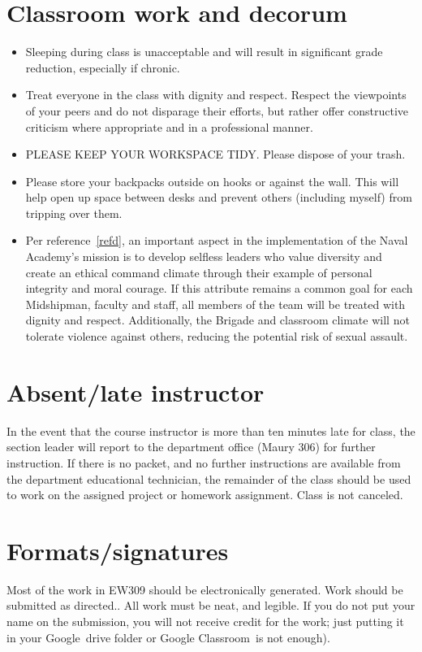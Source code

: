 \documentclass[11pt,courier]{navymemo}
\newcommand{\Google}{Google}
\newcommand{\GoogleClassroom}{Google Classroom}
\begin{document}
\section{Classroom work and decorum}
\begin{itemize}
\item Sleeping during class is unacceptable and will result in significant grade reduction, especially if chronic.
\item Treat everyone in the class with dignity and respect. Respect the viewpoints of your peers and do not disparage their efforts, but rather offer constructive criticism where appropriate and in a professional manner.
\item PLEASE KEEP YOUR WORKSPACE TIDY. Please dispose of your trash.
\item Please store your backpacks outside on hooks or against the wall. This will help open up space between desks and prevent others (including myself) from tripping over them.
\item Per reference~\ref{refd}, an important aspect in the implementation of the Naval Academy’s mission is to develop selfless leaders who value diversity and create an ethical command climate through their example of personal integrity and moral courage. If this attribute remains a common goal for each Midshipman, faculty and staff, all members of the team will be treated with dignity and respect. Additionally, the Brigade and classroom climate will not tolerate violence against others, reducing the potential risk of sexual assault.
\end{itemize}

\section{Absent/late instructor}
In the event that the course instructor is more than ten minutes late for class, the section leader will report to the department office (Maury 306) for further instruction. If there is no packet, and no further instructions are available from the department educational technician, the remainder of the class should be used to work on the assigned project or homework assignment.  Class is not canceled.
 
\section{Formats/signatures}
Most of the work in EW309 should be electronically generated. Work should be submitted as directed.. All work must be neat,  and legible. If you do not put your name on the submission, you will not receive credit for the work; just putting it in your \Google\ drive folder or \GoogleClassroom\ is not enough).
 
\end{document}
